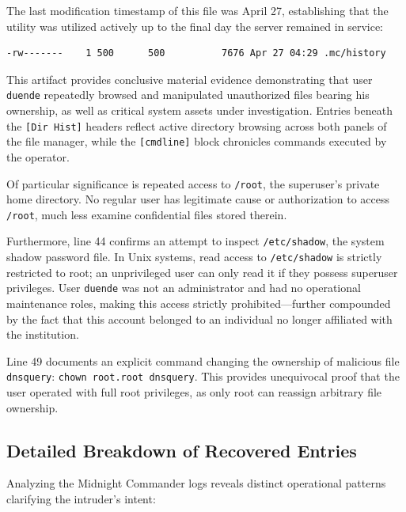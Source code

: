 \vspace{1em}

The last modification timestamp of this file was April 27, establishing that the utility was utilized actively up to the final day the server remained in service:

\vspace{1em}

\begin{lstlisting}[style=terminal]
-rw-------    1 500      500          7676 Apr 27 04:29 .mc/history
\end{lstlisting}

\vspace{1em}

This artifact provides conclusive material evidence demonstrating that user \texttt{duende} repeatedly browsed and manipulated unauthorized files bearing his ownership, as well as critical system assets under investigation. Entries beneath the \texttt{[Dir Hist]} headers reflect active directory browsing across both panels of the file manager, while the \texttt{[cmdline]} block chronicles commands executed by the operator.

Of particular significance is repeated access to \texttt{/root}, the superuser's private home directory. No regular user has legitimate cause or authorization to access \texttt{/root}, much less examine confidential files stored therein.

Furthermore, line 44 confirms an attempt to inspect \texttt{/etc/shadow}, the system shadow password file. In Unix systems, read access to \texttt{/etc/shadow} is strictly restricted to root; an unprivileged user can only read it if they possess superuser privileges. User \texttt{duende} was not an administrator and had no operational maintenance roles, making this access strictly prohibited---further compounded by the fact that this account belonged to an individual no longer affiliated with the institution.

Line 49 documents an explicit command changing the ownership of malicious file \texttt{dnsquery}: \texttt{chown root.root dnsquery}. This provides unequivocal proof that the user operated with full root privileges, as only root can reassign arbitrary file ownership.

\subsection{Detailed Breakdown of Recovered Entries}

Analyzing the Midnight Commander logs reveals distinct operational patterns clarifying the intruder's intent:

